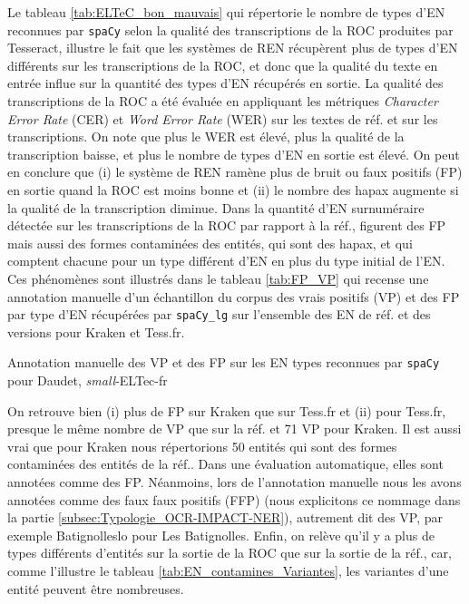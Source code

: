 Le tableau \ref{tab:ELTeC_bon_mauvais} qui répertorie le nombre de types d'EN reconnues par \texttt{spaCy} selon la qualité des transcriptions de la ROC produites par Tesseract, illustre le fait que les systèmes de REN récupèrent plus de types d'EN différents sur les transcriptions de la ROC, et donc que la qualité du texte en entrée influe sur la quantité des types d'EN récupérés en sortie. La qualité des transcriptions de la ROC a été évaluée en appliquant les métriques \textit{Character Error Rate} (CER) et \textit{Word Error Rate} (WER) sur les textes de réf. et sur les transcriptions. On note que plus le WER est élevé, plus la qualité de la transcription baisse, et plus le nombre de types d'EN en sortie est élevé. On peut en conclure que (i) le système de REN ramène plus de bruit ou faux positifs (FP) en sortie quand la ROC est moins bonne et (ii) le nombre des hapax augmente si la qualité de la transcription diminue. 
Dans la quantité d'EN surnuméraire détectée sur les transcriptions de la ROC par rapport à la réf., figurent des FP mais aussi des formes contaminées des entités, qui sont des hapax, et qui comptent chacune pour un type différent d'EN en plus du type initial de l'EN. Ces phénomènes sont illustrés dans le tableau \ref{tab:FP_VP} qui recense une annotation manuelle d'un échantillon du corpus
des vrais positifs (VP) et des FP par type d'EN récupérées par \texttt{spaCy\_lg} sur l'ensemble des EN de réf. et des versions pour Kraken et Tess.fr. 
\begin{table}[h!]
\small
    \centering
    
    \caption{Annotation manuelle des VP et des FP sur les EN types reconnues par \texttt{spaCy} pour Daudet, \textit{small}-ELTec-fr}
    \label{tab:FP_VP}
\end{table}

On retrouve bien (i) plus de FP sur Kraken que sur Tess.fr et (ii) pour Tess.fr, presque le même nombre de VP que sur la réf. et 71 VP pour Kraken. Il est aussi vrai que pour Kraken nous répertorions 50 entités qui sont des formes contaminées des entités de la réf.. Dans une évaluation automatique, elles sont annotées comme des FP. Néanmoins, lors de l'annotation manuelle nous les avons annotées comme des faux faux positifs (FFP) (nous explicitons ce nommage dans la partie \ref{subsec:Typologie_OCR-IMPACT-NER}), autrement dit des VP, par exemple \og{}Batignolleslo\fg{} pour \og{}Les Batignolles\fg{}. Enfin, on relève qu'il y a plus de types différents d'entités sur la sortie de la ROC que sur la sortie de la réf., car, comme l'illustre le tableau \ref{tab:EN_contamines_Variantes}, les variantes d'une entité peuvent être nombreuses. 


